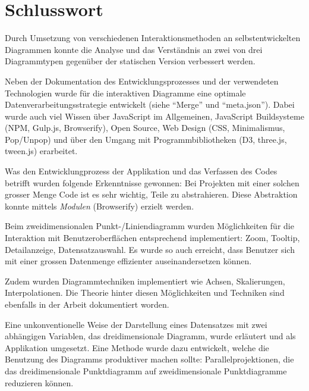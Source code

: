\chapter{Schlusswort}

Durch Umsetzung von verschiedenen Interaktionsmethoden an selbstentwickelten Diagrammen konnte die Analyse und das Verständnis an zwei von drei Diagrammtypen gegenüber der statischen Version verbessert werden.

Neben der Dokumentation des Entwicklungsprozesses und der verwendeten Technologien wurde für die interaktiven Diagramme eine optimale Datenverarbeitungsstrategie entwickelt (siehe "`Merge"' und "`meta.json"'). Dabei wurde auch viel Wissen über JavaScript im Allgemeinen, JavaScript Buildsysteme (NPM, Gulp.js, Browserify), Open Source, Web Design (CSS, Minimalismus, Pop/Unpop) und über den Umgang mit Programmbibliotheken (D3, three.js, tween.js) erarbeitet.

Was den Entwicklungprozess der Applikation und das Verfassen des Codes betrifft wurden folgende Erkenntnisse gewonnen: Bei Projekten mit einer solchen grosser Menge Code ist es sehr wichtig, Teile zu abstrahieren. Diese Abstraktion konnte mittels \textit{Modulen} (Browserify) erzielt werden.

Beim zweidimensionalen Punkt-/Liniendiagramm wurden Möglichkeiten für die Interaktion mit Benutzeroberflächen entsprechend implementiert: Zoom, Tooltip, Detailanzeige, Datensatzauswahl. Es wurde so auch erreicht, dass Benutzer sich mit einer grossen Datenmenge effizienter auseinandersetzen können. 

Zudem wurden Diagrammtechniken implementiert wie Achsen, Skalierungen, Interpolationen. Die Theorie hinter diesen Möglichkeiten und Techniken sind ebenfalls in der Arbeit dokumentiert worden.

Eine unkonventionelle Weise der Darstellung eines Datensatzes mit zwei abhängigen Variablen, das dreidimensionale Diagramm, wurde erläutert und als Applikation umgesetzt. Eine Methode wurde dazu entwickelt, welche die Benutzung des Diagramms produktiver machen sollte: Parallelprojektionen, die das dreidimensionale Punktdiagramm auf zweidimensionale Punktdiagramme reduzieren können.
